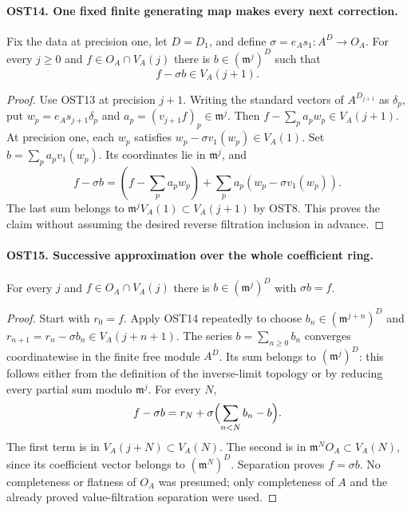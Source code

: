 \documentclass[11pt,a4paper]{article}
\numberwithin{equation}{section}
\theoremstyle{remark}\newtheorem{remark}[theorem]{Remark}
\begin{document}
\paragraph{OST14. One fixed finite generating map makes every next correction.}
\label{claim:OST14}
Fix the data at precision one, let $D=D_1$, and define
$\sigma=e_As_1:A^D\to O_A$.
For every $j\geq0$ and $f\in O_A\cap V_A(j)$ there is
$b\in(\mathfrak m^j)^D$ such that
\begin{equation}\label{eq:ost-one-step}
                         f-\sigma b\in V_A(j+1).
\end{equation}
\begin{proof}
Use OST13 at precision $j+1$.  Writing the standard vectors
of $A^{D_{j+1}}$ as $\delta_p$, put
$w_p=e_As_{j+1}\delta_p$ and
$a_p=(v_{j+1}f)_p\in\mathfrak m^j$.
Then $f-\sum_pa_pw_p\in V_A(j+1)$.
At precision one, each $w_p$ satisfies
$w_p-\sigma v_1(w_p)\in V_A(1)$.
Set $b=\sum_pa_pv_1(w_p)$.  Its coordinates lie in
$\mathfrak m^j$, and
\[
 f-\sigma b=
 (f-\sum_pa_pw_p)+\sum_pa_p(w_p-\sigma v_1(w_p)).
\]
The last sum belongs to $\mathfrak m^jV_A(1)\subset V_A(j+1)$
by OST8.  This proves the claim without assuming the desired
reverse filtration inclusion in advance.
\end{proof}

\paragraph{OST15. Successive approximation over the whole coefficient ring.}
\label{claim:OST15}
For every $j$ and $f\in O_A\cap V_A(j)$ there is
$b\in(\mathfrak m^j)^D$ with $\sigma b=f$.
\begin{proof}
Start with $r_0=f$.  Apply OST14 repeatedly to choose
$b_n\in(\mathfrak m^{j+n})^D$ and
$r_{n+1}=r_n-\sigma b_n\in V_A(j+n+1)$.
The series $b=\sum_{n\geq0}b_n$ converges coordinatewise
in the finite free module $A^D$.  Its sum belongs to
$(\mathfrak m^j)^D$: this follows either from the definition
of the inverse-limit topology or by reducing every partial
sum modulo $\mathfrak m^j$.  For every $N$,
\[
 f-\sigma b=r_N+
          \sigma\Bigl(\sum_{n<N}b_n-b\Bigr).
\]
The first term is in $V_A(j+N)\subset V_A(N)$.
The second is in $\mathfrak m^NO_A\subset V_A(N)$,
since its coefficient vector belongs to $(\mathfrak m^N)^D$.
Separation proves $f=\sigma b$.  No completeness or flatness
of $O_A$ was presumed; only completeness of $A$ and the
already proved value-filtration separation were used.
\end{proof}
\end{document}
